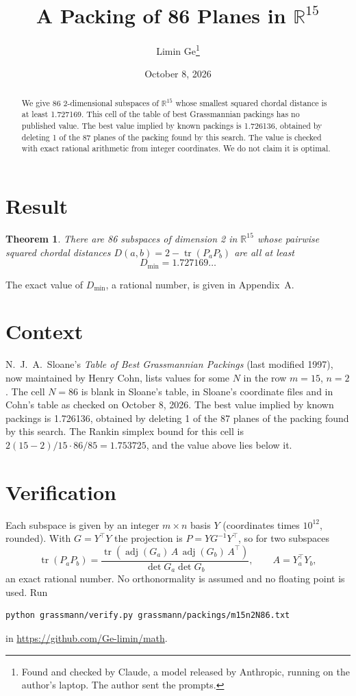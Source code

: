 \documentclass[11pt,a4paper]{article}
\title{A Packing of 86 Planes in $\mathbb{R}^{15}$}
\author{Limin Ge\thanks{Found and checked by Claude, a model released by Anthropic, running on the author's laptop. The author sent the prompts.}}
\date{October 8, 2026}
\newtheorem*{theorem}{Theorem}
\begin{document}
\maketitle
\begin{abstract}
We give 86 2-dimensional subspaces of $\mathbb{R}^{15}$ whose smallest squared chordal distance is at least 1.727169. This cell of the table of best Grassmannian packings has no published value. The best value implied by known packings is 1.726136, obtained by deleting 1 of the 87 planes of the packing found by this search. The value is checked with exact rational arithmetic from integer coordinates. We do not claim it is optimal.
\end{abstract}

\section{Result}
\begin{theorem}
There are 86 subspaces of dimension 2 in $\mathbb{R}^{15}$ whose pairwise squared chordal distances $D(a,b) = 2 - \operatorname{tr}(P_aP_b)$ are all at least
\[ D_{\min} = 1.727169\ldots \]
\end{theorem}
The exact value of $D_{\min}$, a rational number, is given in Appendix~A.


\section{Context}
N.~J.~A.~Sloane's \emph{Table of Best Grassmannian Packings} (last modified 1997), now maintained by Henry Cohn, lists values for some $N$ in the row $m=15$, $n=2$. The cell $N=86$ is blank in Sloane's table, in Sloane's coordinate files and in Cohn's table as checked on October 8, 2026. The best value implied by known packings is 1.726136, obtained by deleting 1 of the 87 planes of the packing found by this search. The Rankin simplex bound for this cell is $2(15-2)/15\cdot 86/85 = 1.753725$, and the value above lies below it.


\section{Verification}
Each subspace is given by an integer $m\times n$ basis $Y$ (coordinates times $10^{12}$, rounded). With $G=Y^\top Y$ the projection is $P=YG^{-1}Y^\top$, so for two subspaces
\[ \operatorname{tr}(P_aP_b)=\frac{\operatorname{tr}(\operatorname{adj}(G_a)\,A\,\operatorname{adj}(G_b)\,A^\top)}{\det G_a\det G_b},\qquad A=Y_a^\top Y_b, \]
an exact rational number. No orthonormality is assumed and no floating point is used. Run
\begin{verbatim}
python grassmann/verify.py grassmann/packings/m15n2N86.txt
\end{verbatim}
in \url{https://github.com/Ge-limin/math}.
\end{document}
